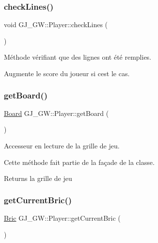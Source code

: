 \subsubsection{\texorpdfstring{check\+Lines()}{checkLines()}}
{\footnotesize\ttfamily void G\+J\+\_\+\+G\+W\+::\+Player\+::check\+Lines (\begin{DoxyParamCaption}{ }\end{DoxyParamCaption})}



Méthode vérifiant que des lignes ont été remplies. 

Augmente le score du joueur si c\textquotesingle{}est le cas. \hypertarget{class_g_j___g_w_1_1_player_a2c0e7ff9befab31e575fb6100a460d45}{}\label{class_g_j___g_w_1_1_player_a2c0e7ff9befab31e575fb6100a460d45} 
\subsubsection{\texorpdfstring{get\+Board()}{getBoard()}}
{\footnotesize\ttfamily \hyperlink{class_g_j___g_w_1_1_board}{Board} G\+J\+\_\+\+G\+W\+::\+Player\+::get\+Board (\begin{DoxyParamCaption}{ }\end{DoxyParamCaption})\hspace{0.3cm}{\ttfamily [inline]}}



Accesseur en lecture de la grille de jeu. 

Cette méthode fait partie de la façade de la classe.

\begin{DoxyReturn}{Returns}
la grille de jeu 
\end{DoxyReturn}
\hypertarget{class_g_j___g_w_1_1_player_a71d0ac01f202e7e53dd626c38a245e19}{}\label{class_g_j___g_w_1_1_player_a71d0ac01f202e7e53dd626c38a245e19} 
\subsubsection{\texorpdfstring{get\+Current\+Bric()}{getCurrentBric()}}
{\footnotesize\ttfamily \hyperlink{class_g_j___g_w_1_1_bric}{Bric} G\+J\+\_\+\+G\+W\+::\+Player\+::get\+Current\+Bric (\begin{DoxyParamCaption}{ }\end{DoxyParamCaption})\hspace{0.3cm}{\ttfamily [inline]}}



